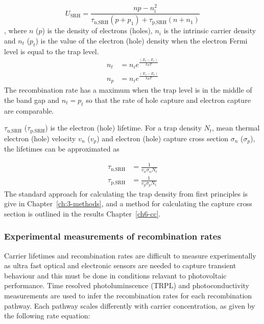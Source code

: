$$ U_\textrm{SRH} = \frac{np-n_\textrm{i}^2}{\tau_\textrm{n,SRH}(p+p_1)+\tau_\textrm{p,SRH}(n+n_1)} $$,
where $n$ ($p$) is the density of electrons (holes), $n_i$ is the intrinsic carrier density and $n_t$ ($p_t$) is the value of the electron (hole) density when the electron Fermi level is equal to the trap level. 
\begin{align}
n_t &= n_ie^{\frac{(E_t-E_c)}{k_BT}} \\
n_p &= n_ie^{\frac{(E_v-E_t)}{k_BT}}
\end{align}
The recombination rate has a maximum when the trap level is in the middle of the band gap and $n_t = p_t$ so that the rate of hole capture and electron capture are comparable. %

$\tau_\textrm{n,SRH}$ ($\tau_\textrm{p,SRH}$) is the electron (hole) lifetime. For a trap density $N_t$, mean thermal electron (hole) velocity $v_n$ ($v_p$) and electron (hole) capture cross section $\sigma_n$ ($\sigma_p$), the lifetimes can be approximated as 

\begin{align}
\tau_\textrm{n,SRH} &= \frac{1}{v_n\sigma_nN_t} \\
\tau_\textrm{p,SRH} &= \frac{1}{v_p\sigma_pN_t}  
\end{align}
The standard approach for calculating the trap density from first principles is give in Chapter\ \ref{ch:3-methods}, and a method for calculating the capture cross section is outlined in the results Chapter\ \ref{ch6-cc}.

\subsubsection{Experimental measurements of recombination rates} 

Carrier lifetimes and recombination rates are difficult to measure experimentally as ultra fast optical and electronic sensors are needed to capture transient behaviour and this must be done in conditions relavant to photovoltaic performance. Time resolved photoluminscence (TRPL) and photoconductivity measurements are used to infer the recombination rates for each recombination pathway.
Each pathway scales differently with carrier concentration, as given by the following rate equation:

